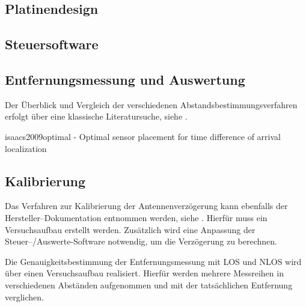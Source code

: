 \begin{comment}
Wie lange halten die Batterien durch?
	- 4.7 m, LOS, Start 13:50-23:50, 12:50-20:00
\end{comment}

\subsection{Platinendesign}

\begin{comment}
\end{comment}

\subsection{Steuersoftware}


\subsection{Entfernungsmessung und Auswertung}

\begin{comment}
- Mit welchen Einstellungen kommt man auf die Entfernungsmessung?
- Streuung?
- LOS/NLOS {Holz, Bücher, Menschlicher Körper}
	- Welcher Fehler ergibt zwischen LOS/NLOS?
- Wie verändert sich die Genauigkeit der Entfernungsmessung bei einer direkten Sichtverbindung (engl. Line--of--sight (LOS)) und indirekten Sichtverbindung (engl. Non--line--of--sight (NLOS))?
\end{comment}

Der Überblick und Vergleich der verschiedenen Abstandsbestimmungsverfahren erfolgt über eine klassische Literatursuche, siehe \cite{lee2007comparative, herranz2010studying, zekavat2011handbook}.


isaacs2009optimal - Optimal sensor placement for time difference of arrival localization



\subsection{Kalibrierung}

\begin{comment}
- Kalibierungsalgorithmus nach decaWave
	- Hab ich den Überhaupt richtig implementiert?
- Kalibierung über die Anpassung der einer Antennen Delay für alle.
- Kann über die Kalibrierung der Antennenverzögerung eine genauere Entfernungsmessung erreicht werden?
\end{comment}


Das Verfahren zur Kalibrierung der Antennenverzögerung kann ebenfalls der Hersteller--Dokumentation entnommen werden, siehe \cite{decawave2014calibration}. Hierfür muss ein Versuchsaufbau erstellt werden. Zusätzlich wird eine Anpassung der Steuer--/Auswerte-Software notwendig, um die Verzögerung zu berechnen.

Die Genauigkeitsbestimmung der Entfernungsmessung mit LOS und NLOS wird über einen Versuchsaufbau realisiert. Hierfür werden mehrere Messreihen in verschiedenen Abständen aufgenommen und mit der tatsächlichen Entfernung verglichen.